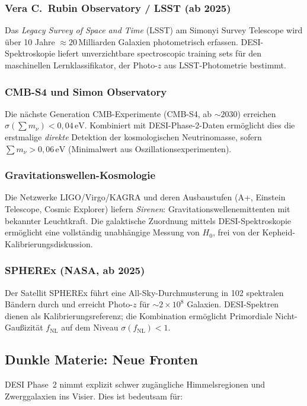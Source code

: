 ﻿\documentclass[a4paper,12pt]{article}
\theoremstyle{definition}
\theoremstyle{remark}
\begin{document}
\subsubsection*{Vera C.~Rubin Observatory / LSST (ab 2025)}
Das \textit{Legacy Survey of Space and Time} (LSST) am Simonyi Survey Telescope
wird über 10 Jahre $\approx 20$\,Milliarden Galaxien photometrisch erfassen.
DESI-Spektroskopie liefert unverzichtbare spectroscopic training sets für den
maschinellen Lernklassifikator, der Photo-$z$ aus LSST-Photometrie bestimmt.

\subsubsection*{CMB-S4 und Simon Observatory}
Die nächste Generation CMB-Experimente (CMB-S4, ab $\sim 2030$) erreichen
$\sigma(\sum m_\nu) < 0{,}04\,\mathrm{eV}$. Kombiniert mit DESI-Phase-2-Daten
ermöglicht dies die erstmalige \textit{direkte} Detektion der kosmologischen
Neutrinomasse, sofern $\sum m_\nu > 0{,}06\,\mathrm{eV}$ (Minimalwert aus
Oszillationsexperimenten).

\subsubsection*{Gravitationswellen-Kosmologie}
Die Netzwerke LIGO/Virgo/KAGRA und deren Ausbaustufen (A+, Einstein Telescope,
Cosmic Explorer) liefern \textit{Sirenen}: Gravitationswellenemittenten mit
bekannter Leuchtkraft. Die galaktische Zuordnung mittels DESI-Spektroskopie
ermöglicht eine vollständig unabhängige Messung von $H_0$, frei von der
Kepheid-Kalibrierungsdiskussion.

\subsubsection*{SPHEREx (NASA, ab 2025)}
Der Satellit SPHEREx führt eine All-Sky-Durchmusterung in 102 spektralen Bändern
durch und erreicht Photo-$z$ für $\sim 2 \times 10^8$ Galaxien. DESI-Spektren
dienen als Kalibrierungsreferenz; die Kombination ermöglicht Primordiale
Nicht-Gaußizität $f_\mathrm{NL}$ auf dem Niveau $\sigma(f_\mathrm{NL}) < 1$.

\subsection{Dunkle Materie: Neue Fronten}

DESI Phase~2 nimmt explizit schwer zugängliche Himmelsregionen und
Zwerggalaxien ins Visier. Dies ist bedeutsam für:
\end{document}
